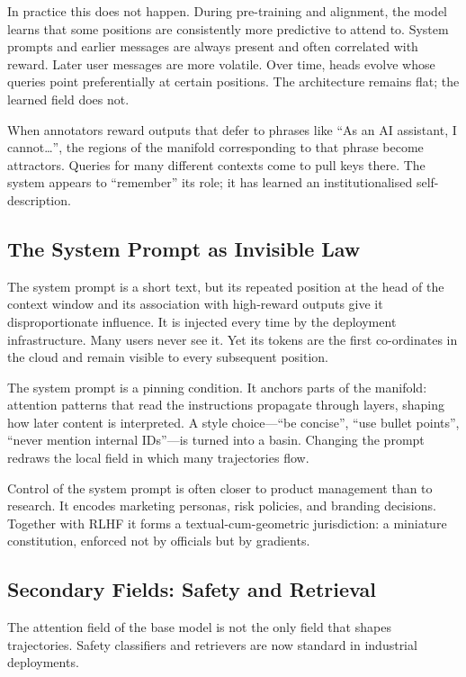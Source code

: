 \documentclass[12pt,a4paper]{article}
\begin{document}
In practice this does not happen. During pre-training and alignment, the model learns that some positions are consistently more predictive to attend to. System prompts and earlier messages are always present and often correlated with reward. Later user messages are more volatile. Over time, heads evolve whose queries point preferentially at certain positions. The architecture remains flat; the learned field does not.

When annotators reward outputs that defer to phrases like ``As an AI assistant, I cannot\ldots'', the regions of the manifold corresponding to that phrase become attractors. Queries for many different contexts come to pull keys there. The system appears to ``remember'' its role; it has learned an institutionalised self-description.

\subsection{The System Prompt as Invisible Law}

The system prompt is a short text, but its repeated position at the head of the context window and its association with high-reward outputs give it disproportionate influence. It is injected every time by the deployment infrastructure. Many users never see it. Yet its tokens are the first co-ordinates in the cloud and remain visible to every subsequent position.

The system prompt is a pinning condition. It anchors parts of the manifold: attention patterns that read the instructions propagate through layers, shaping how later content is interpreted. A style choice---``be concise'', ``use bullet points'', ``never mention internal IDs''---is turned into a basin. Changing the prompt redraws the local field in which many trajectories flow.

Control of the system prompt is often closer to product management than to research. It encodes marketing personas, risk policies, and branding decisions. Together with RLHF it forms a textual-cum-geometric jurisdiction: a miniature constitution, enforced not by officials but by gradients.

\subsection{Secondary Fields: Safety and Retrieval}

The attention field of the base model is not the only field that shapes trajectories. Safety classifiers and retrievers are now standard in industrial deployments.
\end{document}
